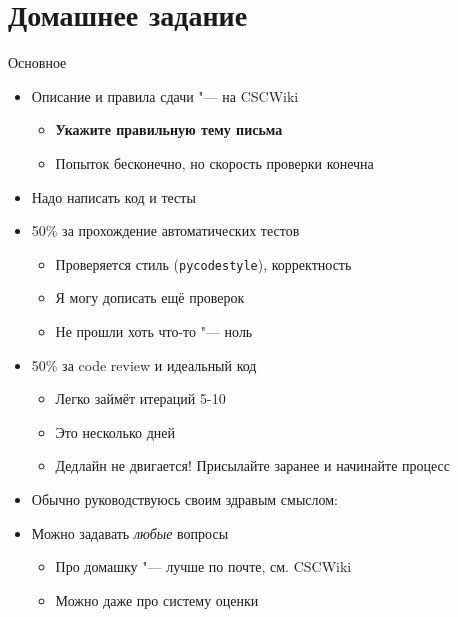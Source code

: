 \section{Домашнее задание}

\begin{frame}[t]{Основное}
	\begin{itemize}
		\item Описание и правила сдачи "--- на CSCWiki
			\begin{itemize}
				\item \textbf{Укажите правильную тему письма}
				\item Попыток бесконечно, но скорость проверки конечна
			\end{itemize}
		\item Надо написать код и тесты
		\item 50\% за прохождение автоматических тестов
			\begin{itemize}
			\item Проверяется стиль (\texttt{pycodestyle}), корректность
			\item Я могу дописать ещё проверок
			\item Не прошли хоть что-то "--- ноль
			\end{itemize}
		\item 50\% за code review и идеальный код
			\begin{itemize}
			\item Легко займёт итераций 5-10
			\item Это несколько дней
			\item Дедлайн не двигается! Присылайте заранее и начинайте процесс
			\end{itemize}
		\item Обычно руководствуюсь своим здравым смыслом:
		\item Можно задавать \textit{любые} вопросы
			\begin{itemize}
			\item Про домашку "--- лучше по почте, см. CSCWiki
			\item Можно даже про систему оценки
			\end{itemize}
	\end{itemize}
\end{frame}
